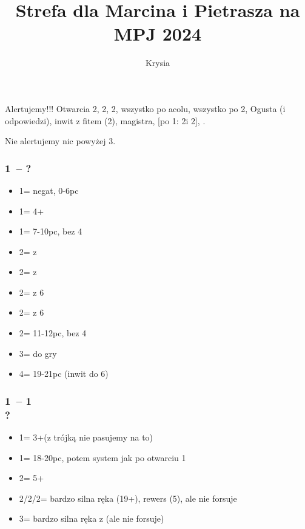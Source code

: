 \documentclass[12pt, a4paper]{article}
\title{Strefa dla Marcina i Pietrasza na MPJ 2024}
\author{Krysia}
\begin{document}
\maketitle

Alertujemy!!! Otwarcia 2\clubs, 2\diams, 2\nt, wszystko po acolu,
wszystko po 2\nt, Ogusta (i odpowiedzi), inwit z fitem (2\nt), magistra,
[po 1\nt : 2\spades i 2\nt], \clubs.

Nie alertujemy nic powyżej 3\nt.

\subsubsection*{1\clubs\ -- ?}
\begin{itemize}
    \item 1\diams = negat, 0-6pc
    \item 1\major = 4+\major
    \item 1\nt = 7-10pc, bez 4\major
    \item 2\clubs = \gf z \clubs
    \item 2\diams = \gf z \diams
    \item 2\hearts = \gf z 6\hearts
    \item 2\spades = \gf z 6\spades
    \item 2\nt = 11-12pc, bez 4\major
    \item 3\nt = do gry
    \item 4\nt = 19-21pc (inwit do 6\nt)
\end{itemize}

\subsubsection*{1\clubs\ -- 1\diams\\
                ?}
\begin{itemize}
    \item 1\major = 3+\major (z trójką nie pasujemy na to)
    \item 1\nt = 18-20pc, potem system jak po otwarciu 1\nt
    \item 2\clubs = 5+\clubs
    \item 2\diams/2\hearts/2\spades = bardzo silna ręka (19+), rewers (5), ale nie forsuje
    \item 3\clubs = bardzo silna ręka z \clubs (ale nie forsuje)
\end{itemize}
\end{document}
